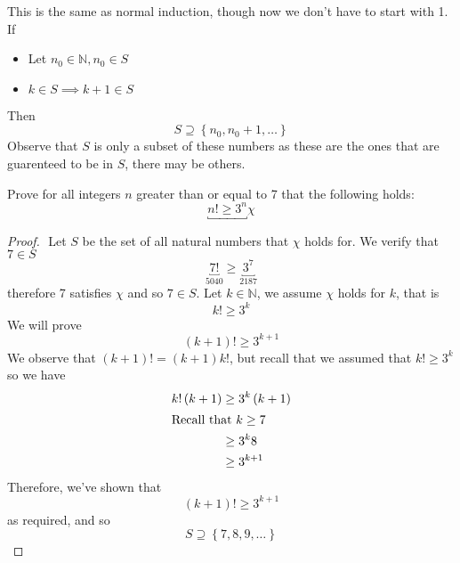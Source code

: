 \documentclass[11pt]{book}
\begin{document}
\newpage

\begin{defn}\label{defn:extended_principle_of_mathmatical_induction_}
    This is the same as normal induction, though now we don't have to start with 1.
    If  
    \begin{itemize}
        \item Let $n_{0} \in \mathbb{N} , n_{0} \in S$
        \item $k \in S \implies k + 1 \in S$ 
    \end{itemize}
    Then
    \[
    \boxed{S \supseteq \left\{ n_{0} , n_{0}  + 1, \ldots  \right\}  }
    \]
    Observe that $S$ is only a subset of these numbers as these are the ones that are guarenteed to be in $S$, there may be others. 
\end{defn}

\begin{eg}
    Prove for all integers $n$ greater than or equal to 7 that the following holds:
    \[
        \underbracket{ n! \ge 3^{n} }{\chi}
    \]
    \begin{proof}
    $ $\newline
        Let $S$ be the set of all natural numbers that $\chi $ holds for. We verify that $7 \in S$ 
        \[
        \underbracket{7!}_{5040} \ge \underbracket{3^{7} }_{2187} 
        \]
        therefore 7 satisfies $\chi$ and so $7 \in S$.
        Let $k \in \mathbb{N} $,  we assume $\chi$ holds for $k$, that is 
        \[
        k! \ge 3^{k} 
        \]
        We will prove 
        \[
            \left( k + 1 \right) ! \ge 3^{k + 1} 
        \]
        We observe that $\left( k + 1 \right) ! = \left( k + 1 \right) k!$, but recall that we assumed that $k! \ge 3^{k} $ so we have 
        \begin{align*}
            k!\left( k + 1 \right) &\ge 3^{k} \left( k + 1 \right) \\
            \intertext{Recall that $k\ge 7$ }
            &\ge 3^{k} 8   \\ 
            &\ge 3^{k + 1}
        \end{align*}
        Therefore, we've shown that
        \[
            \left( k + 1 \right) ! \ge 3^{k + 1} 
        \]
        as required, and so 
        \[
        S \supseteq \left\{ 7, 8, 9, \ldots  \right\} 
        \]
    \end{proof}
    
\end{eg}
\end{document}

